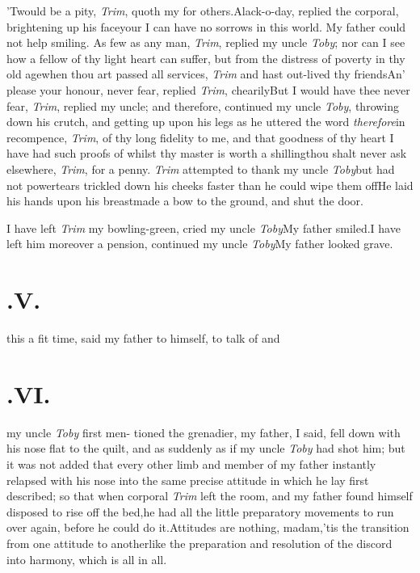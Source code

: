 \documentclass{article}
\begin{document}
\tsk ’Twould be a pity, \textit{Trim}, quoth my
for others.\tsh Alack-o-day, replied the 
corporal, brightening up his face\tsk your
\break
\tsh I can have no sorrows in this world.\break
\tsk My father could not help smiling.\tsk{}
As few as any man, \textit{Trim}, replied my uncle
\textit{Toby}; nor can I see how a fellow of thy light heart
can suffer, but from the distress of poverty in thy old
age\tsk when thou art passed all services, \textit{Trim}\tsk
and hast out-lived thy friends\tsk An’ please your honour,
never fear, replied \textit{Trim}, chearily\tsk But I would
have thee never fear, \textit{Trim}, replied my uncle;
and therefore, continued my uncle
\textit{Toby}, throwing down his crutch, and getting up upon
his legs as he uttered the word \textit{therefore}\tsk in
recompence, \textit{Trim}, of thy long fidelity to me, and
that goodness of thy heart I have had such proofs of\tsk
whilst thy master is worth a shilling\tsk thou shalt never
ask elsewhere, \textit{Trim}, for a penny. \textit{Trim}
attempted to thank my uncle \textit{Toby}\tsk but had not
power\tsk tears trickled down his cheeks faster than he
could wipe them off\tsk He laid his hands upon
his breast\tsh made a bow to the ground, and shut the door.

\tsk I have left \textit{Trim} my bowling-green, cried my
uncle \textit{Toby}\tsk My father smiled.\break\tsk I
have left him moreover a pension, continued my uncle
\textit{Toby}\tsk My father looked grave.

\section{.\enspace V.}

 this a fit time, said my father to\break
himself, to talk of  and\break
{}

\section{.\enspace VI.}

 my uncle \textit{Toby} first men-\break
tioned the grenadier, my father,\break
I said, fell down with his nose flat to the quilt, and as
suddenly as if my uncle
\textit{Toby} had shot him; but it was not added that every
other limb and member of my father instantly relapsed with
his nose into the same precise attitude in which he lay
first described; so that when corporal \textit{Trim} left
the room, and my father found himself disposed to rise off
the bed,\tsk he had all the little preparatory movements to
run over again, before he could do it.\break\tsk  Attitudes are
nothing, madam,\tsk ’tis the transition from one attitude to
another\tsk like the preparation and resolution of the
discord into harmony, which is all in all.
\end{document}
